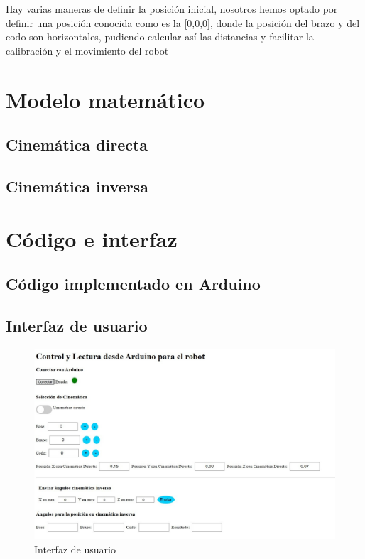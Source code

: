\documentclass[11pt]{article}
\begin{document}
Hay varias maneras de definir la posición inicial, nosotros hemos optado por definir una posición conocida como es la [0,0,0], donde la posición del brazo y del codo son horizontales, pudiendo calcular así las distancias y facilitar la calibración y el movimiento del robot

\section{Modelo matemático}
\label{sec:modelo}


\subsection{Cinemática directa}

\subsection{Cinemática inversa}



\section{Código e interfaz}
\label{sec:código}



\subsection{Código implementado en Arduino}


\subsection{Interfaz de usuario}
\begin{figure}[H]
    \centering
    \includegraphics[width=0.8\linewidth]{figuras/interfaz.jpeg}
    \caption{Interfaz de usuario}
\end{figure}
\end{document}
